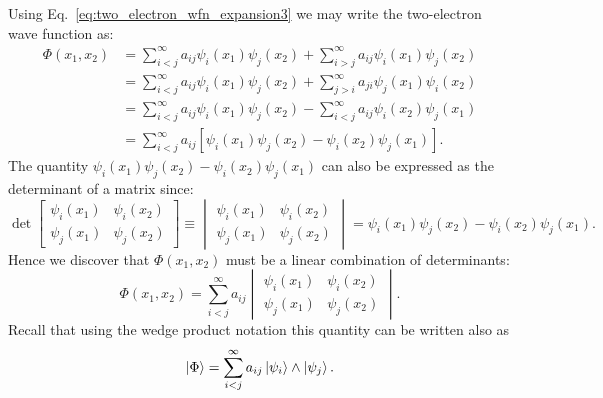 \documentclass[../Main/chem532-notes.tex]{subfiles}
\begin{document}
\begin{example}
Using Eq.~\eqref{eq:two_electron_wfn_expansion3} we may write the two-electron wave function as:
\begin{equation}
\begin{split}
\Phi(x_1,x_2) &= \sum_{i<j}^{\infty} a_{ij} \psi_i(x_1) \psi_j(x_2) + \sum_{i>j}^{\infty} a_{ij} \psi_i(x_1) \psi_j(x_2) \\
&= \sum_{i<j}^{\infty} a_{ij} \psi_i(x_1) \psi_j(x_2) + \sum_{j>i}^{\infty} a_{ji} \psi_j(x_1) \psi_i(x_2) \\
&= \sum_{i<j}^{\infty} a_{ij} \psi_i(x_1) \psi_j(x_2) - \sum_{i<j}^{\infty} a_{ij} \psi_i(x_2) \psi_j(x_1) \\
&= \sum_{i<j}^{\infty} a_{ij} [ \psi_i(x_1) \psi_j(x_2) - \psi_i(x_2) \psi_j(x_1)].
\end{split}
\end{equation}
The quantity $\psi_i(x_1) \psi_j(x_2) - \psi_i(x_2) \psi_j(x_1)$ can also be expressed as the determinant of a matrix since:
\begin{equation}
\det
\begin{bmatrix}
\psi_i(x_1) & \psi_i(x_2) \\
\psi_j(x_1) & \psi_j(x_2) 
\end{bmatrix}
\equiv
\begin{vmatrix}
\psi_i(x_1) & \psi_i(x_2) \\
\psi_j(x_1) & \psi_j(x_2) 
\end{vmatrix}
=
\psi_i(x_1) \psi_j(x_2) - \psi_i(x_2) \psi_j(x_1).
\end{equation}
Hence we discover that $\Phi(x_1,x_2)$ must be a linear combination of determinants:
\begin{equation}
\Phi(x_1,x_2) = \sum_{i<j}^{\infty} a_{ij} 
\begin{vmatrix}
\psi_i(x_1) & \psi_i(x_2) \\
\psi_j(x_1) & \psi_j(x_2)
\end{vmatrix}.
\end{equation}
Recall that using the wedge product notation this quantity can be written also as
\begin{equation}
\ket{\Phi}= \sum_{i<j}^{\infty} a_{ij} 
\ket{\psi_i} \wedge \ket{\psi_j}.
\end{equation}
\end{example}
\end{document}
